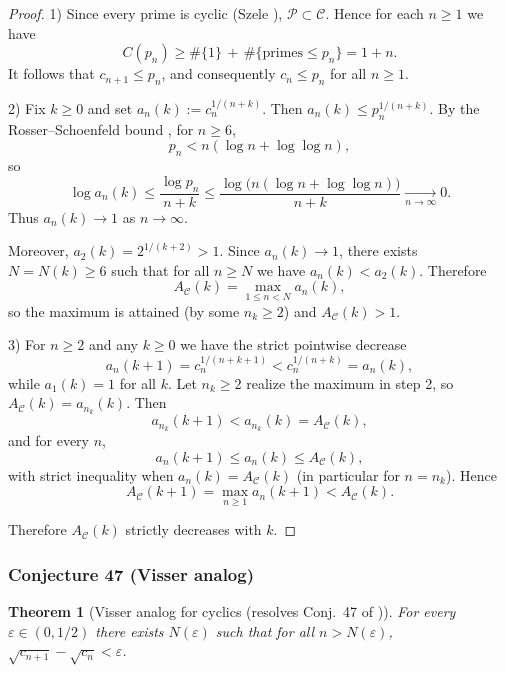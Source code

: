 \documentclass[12pt]{article}
\newtheorem{theorem}{Theorem}
\theoremstyle{remark}
\begin{document}
\begin{proof}
1) Since every prime is cyclic (Szele \cite{Szele1947}), $\mathcal P\subset\mathcal C$. Hence for each $n\ge1$ we have
$$C(p_n)\ge \#\{1\}\,+\,\#\{\text{primes}\le p_n\}=1+n.$$
It follows that $c_{n+1}\le p_n$, and consequently $c_n\le p_n$ for all $n\ge1$.

2) Fix $k\ge0$ and set $a_n(k):=c_n^{1/(n+k)}$. Then $a_n(k)\le p_n^{1/(n+k)}$. By the Rosser--Schoenfeld bound \cite{RosserSchoenfeld1962}, for $n\ge6$,
$$p_n< n(\log n+\log\log n),$$
so
$$\log a_n(k)\le \frac{\log p_n}{n+k}\le \frac{\log\bigl(n(\log n+\log\log n)\bigr)}{n+k}\xrightarrow[n\to\infty]{}0.$$
Thus $a_n(k)\to1$ as $n\to\infty$.

Moreover, $a_2(k)=2^{1/(k+2)}>1$. Since $a_n(k)\to1$, there exists $N=N(k)\ge6$ such that for all $n\ge N$ we have $a_n(k)<a_2(k)$. Therefore
$$A_{\mathcal C}(k)=\max_{1\le n<N} a_n(k),$$
so the maximum is attained (by some $n_k\ge2$) and $A_{\mathcal C}(k)>1$.

3) For $n\ge2$ and any $k\ge0$ we have the strict pointwise decrease
$$a_n(k+1)=c_n^{1/(n+k+1)}<c_n^{1/(n+k)}=a_n(k),$$
while $a_1(k)=1$ for all $k$. Let $n_k\ge2$ realize the maximum in step 2, so $A_{\mathcal C}(k)=a_{n_k}(k)$. Then
$$a_{n_k}(k+1)<a_{n_k}(k)=A_{\mathcal C}(k),$$
and for every $n$,
$$a_n(k+1)\le a_n(k)\le A_{\mathcal C}(k),$$
with strict inequality when $a_n(k)=A_{\mathcal C}(k)$ (in particular for $n=n_k$). Hence
$$A_{\mathcal C}(k+1)=\max_{n\ge1} a_n(k+1)<A_{\mathcal C}(k).$$

Therefore $A_{\mathcal C}(k)$ strictly decreases with $k$. 
\end{proof}


\subsubsection{Conjecture 47 (Visser analog)}
\begin{theorem}[Visser analog for cyclics (resolves Conj.~47 of \cite{Cohen2025})]\label{thm:visser_cyclics}
For every $\varepsilon\in(0,1/2)$ there exists $N(\varepsilon)$ such that for all $n>N(\varepsilon)$, $\sqrt{c_{n+1}}-\sqrt{c_n}<\varepsilon$.
\end{theorem}
\end{document}
